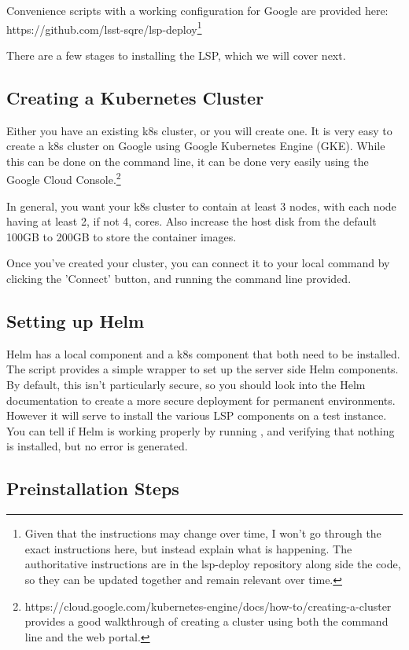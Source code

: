 \documentclass[11pt,twoside]{article}
\begin{document}
Convenience scripts with a working configuration for Google are provided here:
https://github.com/lsst-sqre/lsp-deploy\footnote{Given that the instructions
may change over time, I won't go through the exact
instructions here, but instead explain what is happening.  The authoritative instructions
are in the lsp-deploy repository along side the code, so they can be updated together
and remain relevant over time.}

There are a few stages to installing the LSP, which we will cover next.

\subsection{Creating a Kubernetes Cluster}

Either you have an existing k8s cluster, or you will create one.  It is very
easy to create a k8s cluster on Google using Google Kubernetes Engine (GKE).
While this can be done on the command line, it can be done very easily
using the Google Cloud Console.\footnote{https://cloud.google.com/kubernetes-engine/docs/how-to/creating-a-cluster
provides a good walkthrough of creating a cluster using both the command line
and the web portal.}

In general, you want your k8s cluster to contain at least 3 nodes, with each node
having at least 2, if not 4, cores.  Also increase the host disk from
the default 100GB to 200GB to store the container images.

Once you've created your cluster, you can connect it to your local 
command by clicking the 'Connect' button, and running the command line provided.

\subsection{Setting up Helm}

Helm has a local component and a k8s component that both need to be installed.
The  script provides a simple wrapper to set up the
server side Helm components.
By default, this isn't particularly secure, so you should look into the Helm
documentation to create a more secure deployment for permanent environments.
However it will serve to install the various LSP components on a test instance.
You can tell if Helm is working properly by running , and verifying
that nothing is installed, but no error is generated.

\subsection{Preinstallation Steps}
\end{document}
